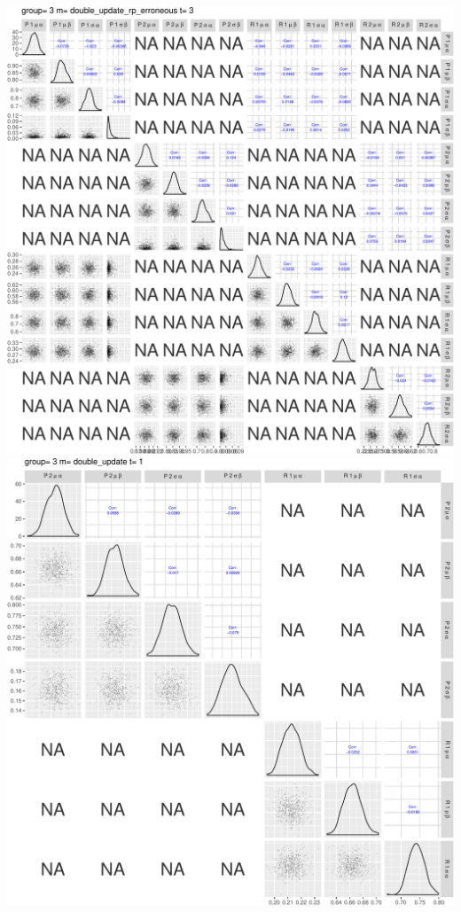 \documentclass[]{article}
\begin{document}
\includegraphics{compare_models_files/figure-latex/PairsPlots-21.pdf}
\includegraphics{compare_models_files/figure-latex/PairsPlots-22.pdf}
\end{document}
